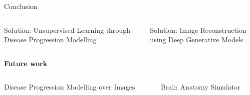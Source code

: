 \documentclass[8pt,xcolor=table,aspectratio=169]{beamer}
\begin{document}
\begin{frame}{Conclusion}
\begin{columns}[t]
\begin{column}{0.5\textwidth}
\vspace{1em}


\end{column}
\end{columns}


\begin{columns}[t]
\begin{column}{0.5\textwidth}
\centering

Solution: Unsupervised Learning through\\
Disease Progression Modelling\\
\vo


\end{column}
\begin{column}{0.5\textwidth}
\centering

Solution: Image Reconstruction\\ using Deep Generative Models\\
\vo
\brgmoursshort

\end{column}
\end{columns}
 
\begin{center}
 \large{\textbf{Future work}}
\end{center}
\begin{columns}[t]
\begin{column}{0.5\textwidth}
\centering
Disease Progression Modelling over Images
 
\end{column}
\begin{column}{0.5\textwidth}
\centering
Brain Anatomy Simulator
\end{column}
\end{columns}



 
 
\end{frame}
\end{document}
